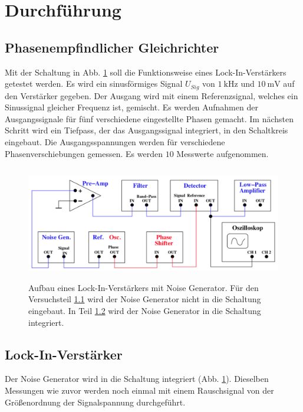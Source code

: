 \section{Durchführung}
\label{sec:Durchführung}


\subsection{Phasenempfindlicher Gleichrichter} %
\label{sec:eins}
Mit der Schaltung in Abb. \ref{lockin2} soll die Funktionsweise eines Lock-In-Verstärkers getestet werden.
Es wird ein sinusförmiges Signal $U_{Sig}$ von $\SI{1}{\kilo\hertz}$ und 
$\SI{10}{\milli\volt}$ auf den Verstärker gegeben.
Der Ausgang wird mit einem Referenzsignal, welches ein Sinussignal gleicher Frequenz ist, gemischt.
Es werden Aufnahmen der Ausgangssignale für fünf verschiedene eingestellte Phasen gemacht.
\newline
Im nächsten Schritt wird ein Tiefpass, der das Ausgangssignal integriert, 
in den Schaltkreis eingebaut. %
Die Ausgangsspannungen werden für verschiedene Phasenverschiebungen gemessen.
Es werden $\num{10}$ Messwerte aufgenommen. %
\begin{figure}
    \centering
    \includegraphics[width=12cm, height=5cm]{build/lockin2.png}
    \caption{Aufbau eines Lock-In-Verstärkers mit Noise Generator.
    Für den Versuchsteil \ref{sec:eins} wird der Noise Generator nicht in die 
    Schaltung eingebaut. In Teil \ref{sec:zwei} wird der Noise Generator in die 
    Schaltung integriert.}
    \label{lockin2}
\end{figure}

\subsection{Lock-In-Verstärker} %
\label{sec:zwei}
Der Noise Generator wird in die Schaltung integriert (Abb. \ref{lockin2}).
Dieselben Messungen wie zuvor werden noch einmal mit einem Rauschsignal von der Größenordnung der Signalspannung 
durchgeführt.

